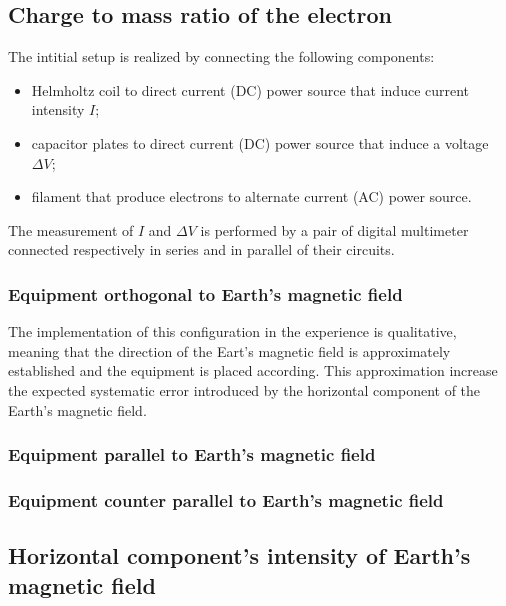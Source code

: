 
\subsection{Charge to mass ratio of the electron}
The intitial setup is realized by connecting the following components:
\begin{itemize}
	\item Helmholtz coil to direct current (DC) power source that induce current intensity $I$;
	\item capacitor plates to direct current (DC) power source that induce a voltage $\Delta V$;
	\item filament that produce electrons to alternate current (AC) power source.
\end{itemize}

The measurement of $I$ and $\Delta V$ is performed by a pair of digital multimeter connected 
respectively in series and in parallel of their circuits.

\subsubsection{Equipment orthogonal to Earth's magnetic field}
The implementation of this configuration in the experience is qualitative, 
meaning that the direction of the Eart's magnetic field is approximately established 
and the equipment is placed according.
This approximation increase the expected systematic error introduced by the horizontal component of 
the Earth's magnetic field.



\subsubsection{Equipment parallel to Earth's magnetic field}

\subsubsection{Equipment counter parallel to Earth's magnetic field}

\subsection{Horizontal component's intensity of Earth's magnetic field}